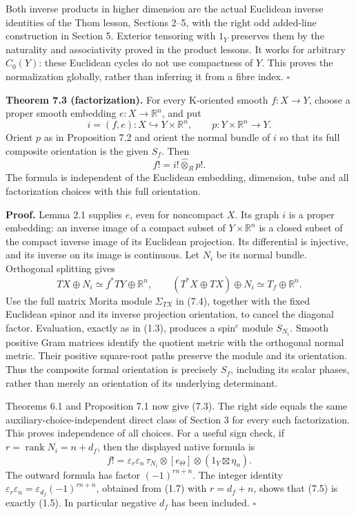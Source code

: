 \documentclass[
  11pt,
]{article}
\begin{document}
Both inverse products in higher dimension are the actual Euclidean
inverse identities of the Thom lesson, Sections 2--5, with the right odd
added-line construction in Section 5. Exterior tensoring with \(1_Y\)
preserves them by the naturality and associativity proved in the product
lessons. It works for arbitrary \(C_0(Y)\): these Euclidean cycles do
not use compactness of \(Y\). This proves the normalization globally,
rather than inferring it from a fibre index. \(\square\)

\textbf{Theorem 7.3 (factorization).} For every K-oriented smooth
\(f:X\to Y\), choose a proper smooth embedding \(e:X\to\mathbb R^n\),
and put \[
 i=(f,e):X\hookrightarrow Y\times\mathbb R^n,
 \qquad p:Y\times\mathbb R^n\to Y.
\] Orient \(p\) as in Proposition 7.2 and orient the normal bundle of
\(i\) so that its full composite orientation is the given \(S_f\). Then
\[
 f!=i!\widehat\otimes_Rp!.
 \tag{7.3}
\] The formula is independent of the Euclidean embedding, dimension,
tube and all factorization choices with this full orientation.

\textbf{Proof.} Lemma 2.1 supplies \(e\), even for noncompact \(X\). Its
graph \(i\) is a proper embedding: an inverse image of a compact subset
of \(Y\times\mathbb R^n\) is a closed subset of the compact inverse
image of its Euclidean projection. Its differential is injective, and
its inverse on its image is continuous. Let \(N_i\) be its normal
bundle. Orthogonal splitting gives \[
 TX\oplus N_i\simeq f^*TY\oplus\mathbb R^n,
 \qquad
 (T^*X\oplus TX)\oplus N_i\simeq T_f\oplus\mathbb R^n.
 \tag{7.4}
\] Use the full matrix Morita module \(\Sigma_{TX}\) in (7.4), together
with the fixed Euclidean spinor and its inverse projection orientation,
to cancel the diagonal factor. Evaluation, exactly as in (1.3), produces
a spin\(^{c}\) module \(S_{N_i}\). Smooth positive Gram matrices
identify the quotient metric with the orthogonal normal metric. Their
positive square-root paths preserve the module and its orientation. Thus
the composite formal orientation is precisely \(S_f\), including its
scalar phases, rather than merely an orientation of its underlying
determinant.

Theorems 6.1 and Proposition 7.1 now give (7.3). The right side equals
the same auxiliary-choice-independent direct class of Section 3 for
every such factorization. This proves independence of all choices. For a
useful sign check, if \(r=\operatorname{rank}N_i=n+d_f\), then the
displayed native formula is \[
 f!=\varepsilon_r\varepsilon_n\,
       \tau_{N_i}\otimes[e_\Theta]\otimes(1_Y\boxtimes\eta_n).
 \tag{7.5}
\] The outward formula has factor \((-1)^{rn+n}\). The integer identity
\(\varepsilon_r\varepsilon_n=\varepsilon_{d_f}(-1)^{rn+n}\), obtained
from (1.7) with \(r=d_f+n\), shows that (7.5) is exactly (1.5). In
particular negative \(d_f\) has been included. \(\square\)
\end{document}

